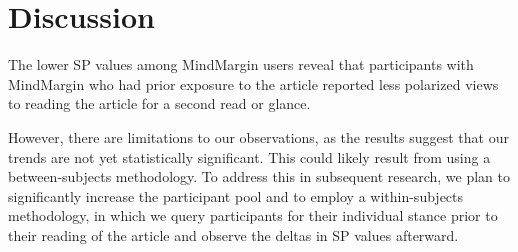 \section{Discussion}


The lower SP values among MindMargin users reveal that participants with MindMargin who had prior exposure to the article reported less polarized views to reading the article for a second read or glance. 

However, there are limitations to our observations, as the results suggest that our trends are not yet statistically significant. This could likely result from using a between-subjects methodology. To address this in subsequent research, we plan to significantly increase the participant pool and to employ a within-subjects methodology, in which we query participants for their individual stance prior to their reading of the article and observe the deltas in SP values afterward. 

